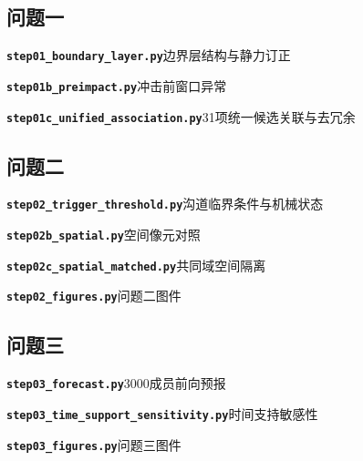 \subsection*{问题一}
\noindent\textbf{\texttt{step01\_boundary\_layer.py}}\quad 边界层结构与静力订正\par\nopagebreak

\noindent\textbf{\texttt{step01b\_preimpact.py}}\quad 冲击前窗口异常\par\nopagebreak

\noindent\textbf{\texttt{step01c\_unified\_association.py}}\quad 31项统一候选关联与去冗余\par\nopagebreak


\subsection*{问题二}
\noindent\textbf{\texttt{step02\_trigger\_threshold.py}}\quad 沟道临界条件与机械状态\par\nopagebreak

\noindent\textbf{\texttt{step02b\_spatial.py}}\quad 空间像元对照\par\nopagebreak

\noindent\textbf{\texttt{step02c\_spatial\_matched.py}}\quad 共同域空间隔离\par\nopagebreak

\noindent\textbf{\texttt{step02\_figures.py}}\quad 问题二图件\par\nopagebreak


\subsection*{问题三}
\noindent\textbf{\texttt{step03\_forecast.py}}\quad 3000成员前向预报\par\nopagebreak

\noindent\textbf{\texttt{step03\_time\_support\_sensitivity.py}}\quad 时间支持敏感性\par\nopagebreak

\noindent\textbf{\texttt{step03\_figures.py}}\quad 问题三图件\par\nopagebreak


